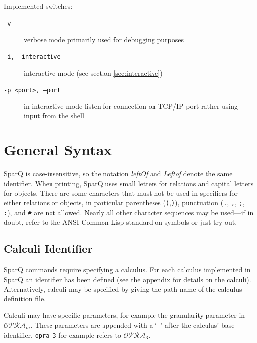 \documentclass[headsepline]{scrreprt}
\theoremstyle{definition}
\newcommand{\engine}{SparQ}
\newcommand{\opra}{$\mathcal{OPRA}_m$}
\newcommand{\opradrei}{$\mathcal{OPRA}_3$}
\begin{document}
Implemented switches:
\begin{description}
	\item[{\tt -v}] verbose mode primarily used for debugging purposes
	\item[{\tt -i, --interactive}] interactive mode (see section \ref{sec:interactive})
	\item[{\tt -p <port>, --port}] in interactive mode listen for connection on TCP/IP port rather using input from the shell
\end{description}


\section{General Syntax}\label{sec:syntax}

\engine{} is case-insensitive, so the notation {\em leftOf} and {\em Leftof} denote the same identifier. When printing, \engine{} uses small letters for relations and capital letters for objects.
There are some characters that must not be used in specifiers for either relations or objects, in particular parentheses ({\tt (},{\tt )}), punctuation ({\tt .}, {\tt ,}, {\tt ;}, {\tt :}), and {\tt \#} are not allowed. Nearly all other character sequences may be used---if in doubt, refer to the ANSI Common Lisp standard on symbols or just try out.


\subsection{Calculi Identifier}

\engine{} commands require specifying a calculus. For each calculus implemented in \engine{} an identifier has been defined (see the appendix for details on the calculi). Alternatively, calculi may be specified by giving the path name of the calculus definition file.

Calculi may have specific parameters, for example the granularity parameter in \opra{}. These parameters are appended with a `\verb|-|' after the calculus' base identifier. \verb|opra-3| for example refers to \opradrei{}. \pagebreak[4]
\end{document}
